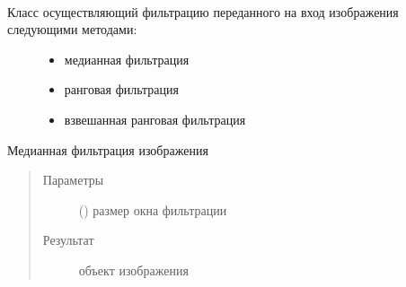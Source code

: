 \documentclass[letterpaper,10pt,russian]{sphinxmanual}
\begin{document}
\begin{fulllineitems}
\label{\detokenize{FilteredImage:FilteredImage.FilteredImage}}~\begin{description}
\item[{Класс осуществляющий фильтрацию переданного на вход изображения следующими методами:}] \leavevmode\begin{itemize}
\item {} 
{\hyperref[\detokenize{FilteredImage:FilteredImage.FilteredImage.median_filter}]{}} \textendash{} медианная фильтрация

\item {} 
{\hyperref[\detokenize{FilteredImage:FilteredImage.FilteredImage.rank_filter}]{}} \textendash{} ранговая фильтрация

\item {} 
{\hyperref[\detokenize{FilteredImage:FilteredImage.FilteredImage.weighted_rank_filter}]{}} \textendash{} взвешанная ранговая фильтрация

\end{itemize}

\end{description}

\begin{fulllineitems}
\label{\detokenize{FilteredImage:FilteredImage.FilteredImage.median_filter}}
Медианная фильтрация изображения
\begin{quote}\begin{description}
\item[{Параметры}] \leavevmode
{} () \textendash{} размер окна фильтрации

\item[{Результат}] \leavevmode
{\hyperref[\detokenize{BaseImage:core.LabImage}]{}} \textendash{} объект изображения


\end{description}
\end{quote}
\end{fulllineitems}
\end{fulllineitems}
\end{document}
